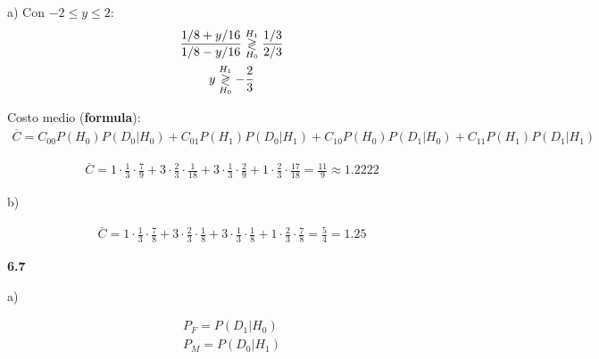 a)
Con $-2 \leq y \leq 2$:
\begin{equation*}
\begin{gathered}
	\frac{1/8 + y/16}{1/8 - y/16} \overset{H_1}{\underset{H_0}{\gtrless}} \frac{1/3}{2/3}	\\
	y \overset{H_1}{\underset{H_0}{\gtrless}} -\frac{2}{3}
\end{gathered}
\end{equation*}

Costo medio (\textbf{formula}):
\begin{equation*}
\begin{gathered}
	\overline{C} = C_{00} P(H_0) P(D_0|H_0) + C_{01} P(H_1) P(D_0|H_1) + C_{10} P(H_0) P(D_1|H_0) + C_{11} P(H_1) P(D_1|H_1)
\end{gathered}
\end{equation*}

\begin{equation*}
\begin{gathered}
	\overline{C} = 1 \cdot \frac{1}{3} \cdot \frac{7}{9} + 3 \cdot \frac{2}{3} \cdot \frac{1}{18} + 3 \cdot \frac{1}{3} \cdot \frac{2}{9} + 1 \cdot \frac{2}{3} \cdot \frac{17}{18} = \frac{11}{9} \approx 1.2222
\end{gathered}
\end{equation*}

b)

\begin{equation*}
\begin{gathered}
	\overline{C} = 1 \cdot \frac{1}{3} \cdot \frac{7}{8} + 3 \cdot \frac{2}{3} \cdot \frac{1}{8} + 3 \cdot \frac{1}{3} \cdot \frac{1}{8} + 1 \cdot \frac{2}{3} \cdot \frac{7}{8} = \frac{5}{4} = 1.25
\end{gathered}
\end{equation*}

\vspace{1cm}

\textbf{6.7}

a)

\begin{equation*}
\begin{gathered}
	P_F = P(D_1|H_0)	\\
	P_M = P(D_0|H_1)
\end{gathered}
\end{equation*}


